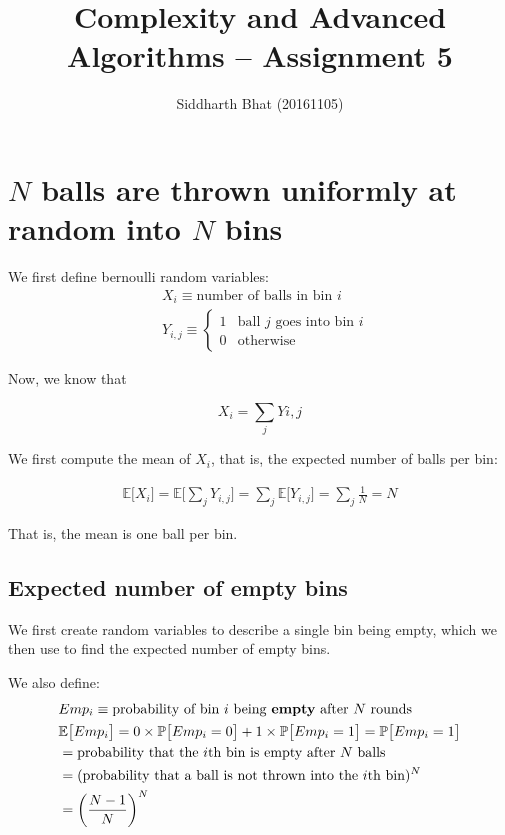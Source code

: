 \documentclass{article}
\author{Siddharth Bhat (20161105)}
\title{Complexity and Advanced Algorithms -- Assignment 5}
\begin{document}
\newcommand{\threesat}{\texttt{3-SAT}~}
\newcommand{\pspace}{\texttt{PSPACE}~}
\newcommand{\np}{\texttt{NP}~}
\newcommand{\nat}{\mathbb{N}~}
\newcommand{\pred}{\mathbb{P}~}
\newcommand{\logspace}{\texttt{LOGSPACE}~}
\newcommand{\nlogspace}{\texttt{NLOGSPACE}~}
\newcommand{\ptime}{\texttt{P}~}
\newcommand{\nptime}{\texttt{NP}~}
\newcommand{\E}[1]{\mathbb{E}\big[ #1 \big]}
\newcommand{\prob}[1]{\mathbb{P}\big [ #1 \big ]}
\maketitle

\section{$N$ balls are thrown uniformly at random into $N$ bins}
We first define bernoulli random variables:
\begin{align*}
	&X_i \equiv \text{number of balls in bin $i$} \\
	&Y_{i, j} \equiv
	\begin{cases}
	1 & \text{ball $j$ goes into bin $i$} \\
	0 & \text{otherwise}
	\end{cases}
\end{align*}

Now, we know that

$$
X_i = \sum_j Y{i, j}
$$

We first compute the mean of $X_i$, that is, the expected number of
balls per bin:

\begin{align*}
	\E{X_i} = \E{\sum_j Y_{i, j}} = \sum_j \E{Y_{i, j}} = \sum_j \frac{1}{N} = N
\end{align*}

That is, the mean is one ball per bin.

\subsection{Expected number of empty bins}
We first create random variables to describe a single bin being empty,
which we then use to find the expected number of empty bins.


We also define:
\begin{align*}
	&Emp_i \equiv \text{probability of bin $i$ being \textbf{empty} after $N$ rounds} \\
    &\E{Emp_i} = 0 \times \prob{Emp_i=0} + 1 \times \prob{Emp_i=1}  = \prob{Emp_i=1}\\
    &= \text{probability that the $i$th bin is empty after $N$ balls} \\
    &= (\text{probability that a ball is not thrown into the $i$th bin})^N \\
    &= {\bigg( \frac{N - 1}{N} \bigg)}^N
\end{align*}
\end{document}
